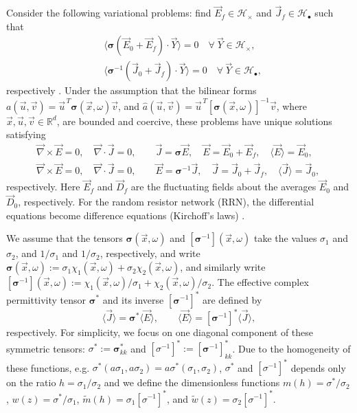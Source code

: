 \documentclass[english,12pt,jmp,graphicx]{revtex4-1}
\begin{document}
Consider the following variational problems: 
find $\vec{E}_f\in\mathscr{H}_\times$ and  $\vec{J}_f\in \mathscr{H}_{\bullet}$ such
that    
%
\begin{align}
  \label{eq:Weak_Curl_Free_Variational_Form}
 &\langle\bm{\sigma}(\vec{E}_0+\vec{E}_f)\cdot\vec{Y}\rangle=0 \quad  \forall \
  \vec{Y}\in\mathscr{H}_\times,\\
%
  \label{eq:Weak_Div_Free_Variational_Form}
 &\langle\bm{\sigma}^{-1}(\vec{J}_0+\vec{J}_f)\cdot\vec{Y}\rangle=0 \quad  \forall \
  \vec{Y}\in\mathscr{H}_{\bullet},  
\end{align}
%
respectively \cite{Golden:CMP-473}. Under the assumption that the
bilinear forms
$a(\vec{u},\vec{v})=\vec{u}^{\,T}\bm{\sigma}(\vec{x},\omega)\vec{v}$, and
$\hat{a}(\vec{u},\vec{v})=\vec{u}^{\,T}[\bm{\sigma}(\vec{x},\omega)]^{-1}\vec{v}$,
where $\vec{x},\vec{u},\vec{v}\in\mathbb{R}^d$, are bounded and
coercive, these problems have unique solutions satisfying
\cite{Golden:CMP-473} 
%
\begin{align}
  \label{eq:Maxwells_Equations_ED}  
  &\vec{\nabla}\times\vec{E}=0, \quad
  \vec{\nabla}\cdot\vec{J}=0,\quad \quad
  \vec{J}=\bm{\sigma}\vec{E},\quad
  \vec{E}=\vec{E}_0+\vec{E}_f, \quad
  \langle\vec{E}\rangle=\vec{E}_0,\\
%
  \label{eq:Homogenization_Equations_D}
   &\vec{\nabla}\times\vec{E}=0, \quad
   \vec{\nabla}\cdot\vec{J}=0,\quad   \quad
   \vec{E}=\bm{\sigma}^{-1}\vec{J},\quad   
   \vec{J}=\vec{J}_0+\vec{J}_f,\quad
   \langle\vec{J}\rangle=\vec{J}_0,\quad
\end{align}
%
respectively. Here $\vec{E}_f$ and $\vec{D}_f$ are the fluctuating
fields about the averages $\vec{E}_0$ and $\vec{D}_0$,
respectively. For the random resistor network (RRN), the differential
equations become difference equations (Kirchoff's laws)
\cite{Golden:CMP-467,Golden:JMP-5627}.  

We assume that the tensors $\bm{\sigma}(\vec{x},\omega)$ and
$[\bm{\sigma}^{-1}](\vec{x},\omega)$ take the values $\sigma_1$ and $\sigma_2$, and
$1/\sigma_1$ and $1/\sigma_2$, respectively, and write
$\bm{\sigma}(\vec{x},\omega):=\sigma_1\chi_1(\vec{x},\omega)+\sigma_2\chi_2(\vec{x},\omega)$, and 
similarly write
$[\bm{\sigma}^{-1}](\vec{x},\omega):=\chi_1(\vec{x},\omega)/\sigma_1+\chi_2(\vec{x},\omega)/\sigma_2$.  
The effective complex permittivity tensor $\bm{\sigma}^*$ and its inverse
$[\bm{\sigma}^{-1}]^*$ are defined by 
%
\begin{equation}\label{eq:eff_eps_def}
    \langle \vec{J} \rangle=  \bm{\sigma} ^* \langle \vec{E} \rangle,\qquad
    \langle \vec{E} \rangle=  [\bm{\sigma}^{-1}]^{*} \langle \vec{J} \rangle,
\end{equation}
%
respectively. For simplicity, we focus on one diagonal component of
these symmetric tensors: $\sigma^*:=\bm{\sigma}^*_{kk}$ and
$[\sigma^{-1}]^*:=[\bm{\sigma}^{-1}]^*_{kk}$. Due to the homogeneity of these
functions, e.g. $\sigma^*(a\sigma_1,a\sigma_2)=a\sigma^*(\sigma_1,\sigma_2)$, $\sigma^*$ and $[\sigma^{-1}]^*$
depends only on the ratio $h = \sigma_1/\sigma_2$ and we define the
dimensionless functions $m(h)=\sigma^*/\sigma_2$, $w(z)=\sigma^*/\sigma_1$,
$\tilde{m}(h)=\sigma_1[\sigma^{-1}]^*$, and $\tilde{w}(z)=\sigma_2[\sigma^{-1}]^*$.
\end{document}
